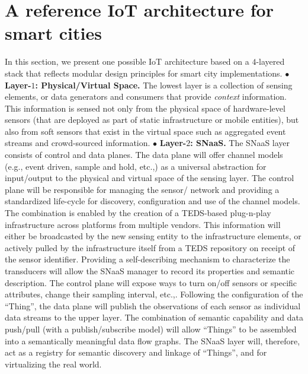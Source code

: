 \documentclass[conference]{IEEEtran}
\begin{document}
\section{A reference IoT architecture for smart cities}\label{sec:refIoT}

In this section, we present one possible IoT architecture based on a $4$-layered stack that reflects modular design principles for smart city implementations.
\vspace{1mm}
\newline
\noindent
$\bullet$ \textbf{Layer-$1$: Physical/Virtual Space.}
The lowest layer is a collection of sensing elements, or data generators and consumers that provide \emph{context} information.
This information is sensed not only from the physical space of hardware-level sensors (that are deployed as part of static infrastructure or mobile entities), but also from soft sensors that exist in the virtual space such as aggregated event streams and crowd-sourced information.
\vspace{1mm}
\newline
\noindent
$\bullet$ \textbf{Layer-$2$: SNaaS.}
The SNaaS layer consists of control and data planes.
The data plane will offer channel models (e.g., event driven, sample and hold, etc.,) as a universal abstraction for input/output to the physical and virtual space of the sensing layer.
The control plane will be responsible for managing the sensor/ network and providing a standardized life-cycle for discovery, configuration and use of the channel models.
The combination is enabled by the creation of a TEDS-based plug-n-play infrastructure across platforms from multiple vendors.
This information will either be broadcasted by the new sensing entity to the infrastructure elements, or actively pulled by the infrastructure itself from a TEDS repository on receipt of the sensor identifier. 
Providing a self-describing mechanism to characterize the transducers will allow the SNaaS manager to record its properties and semantic description. 
The control plane will expose ways to turn on/off sensors or specific attributes, change their sampling interval, etc.,.\newline
\indent
Following the configuration of the ``Thing'', the data plane will publish the observations of each sensor as individual data streams to the upper layer.
The combination of semantic capability and data push/pull (with a publish/subscribe model) will allow ``Things'' to be assembled into a semantically meaningful data flow graphs\cite{Zhouiswc:2012}.
The SNaaS layer will, therefore, act as a registry for semantic discovery and linkage of ``Things'', and for virtualizing the real world.
\end{document}
